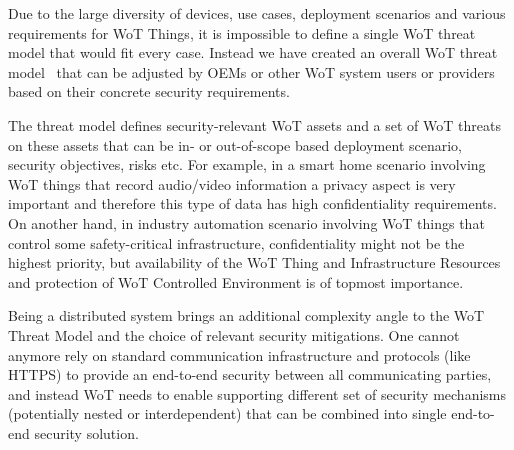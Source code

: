 
Due to the large diversity of devices, use cases, deployment scenarios and various requirements for WoT Things, it is impossible to define a single WoT threat model that would fit every case.
Instead we have created an overall WoT threat model~\cite{Wot2017sec} that can be adjusted by OEMs or other WoT system users or providers based on their concrete security requirements.


The threat model defines security-relevant WoT assets and a set of WoT threats on these assets that can be in- or out-of-scope based deployment scenario, security objectives, risks etc.
For example, in a smart home scenario involving WoT things that record audio/video information a privacy aspect is very important and therefore this type of data has high confidentiality requirements.
On another hand, in industry automation scenario involving WoT things that control some safety-critical infrastructure, confidentiality might not be the highest priority, but availability of the WoT Thing and Infrastructure Resources and protection of WoT Controlled Environment is of topmost importance.

Being a distributed system brings an additional complexity angle to the WoT Threat Model and the choice of relevant security mitigations.
One cannot anymore rely on standard communication infrastructure and protocols (like HTTPS) to provide an end-to-end security between all communicating parties, and instead WoT needs to enable supporting different set of security mechanisms (potentially nested or interdependent) that can be combined into single end-to-end security solution.  
  
 

